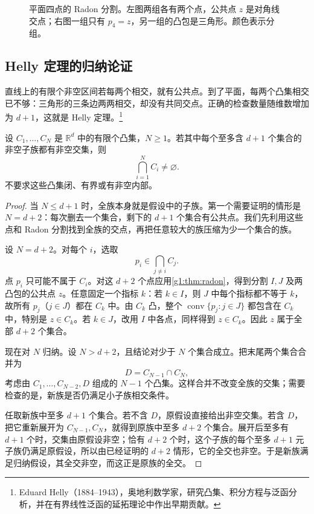 \begin{figure}[htbp]
	\centering
	
	\caption[平面四点的 Radon 分割]{平面四点的 Radon 分割。左图两组各有两个点，公共点 \(z\) 是对角线交点；右图一组只有 \(p_4=z\)，另一组的凸包是三角形。颜色表示分组。}
	\label{g1:fig:radon}
\end{figure}

\subsection{Helly 定理的归纳论证}
\label{g1:subsec:0302:03}

直线上的有限个非空区间若每两个相交，就有公共点。到了平面，每两个凸集相交已不够：三角形的三条边两两相交，却没有共同交点。正确的检查数量随维数增加为 \(d+1\)，这就是 Helly 定理。\footnote{Eduard Helly（1884--1943），奥地利数学家，研究凸集、积分方程与泛函分析，并在有界线性泛函的延拓理论中作出早期贡献。}

\begin{theorem}\label{g1:thm:helly}
	设 \(C_1,\ldots,C_N\) 是 \(\mathbb R^d\) 中的有限个凸集，\(N\ge1\)。若其中每个至多含 \(d+1\) 个集合的非空子族都有非空交集，则
	\[
		\bigcap_{i=1}^N C_i\ne\varnothing.
	\]
	不要求这些凸集闭、有界或有非空内部。
\end{theorem}
\begin{proof}
	当 \(N\le d+1\) 时，全族本身就是假设中的子族。第一个需要证明的情形是 \(N=d+2\)：每次删去一个集合，剩下的 \(d+1\) 个集合有公共点。我们先利用这些点和 Radon 分割找到全族的交点，再把任意较大的族压缩为少一个集合的族。

	设 \(N=d+2\)。对每个 \(i\)，选取
	\[
		p_i\in\bigcap_{j\ne i}C_j.
	\]
	点 \(p_i\) 只可能不属于 \(C_i\)。对这 \(d+2\) 个点应用\cref{g1:thm:radon}，得到分割 \(I,J\) 及两凸包的公共点 \(z\)。任意固定一个指标 \(k\)：若 \(k\in I\)，则 \(J\) 中每个指标都不等于 \(k\)，故所有 \(p_j\)（\(j\in J\)）都在 \(C_k\) 中。由 \(C_k\) 凸，整个 \(\operatorname{conv}\{p_j:j\in J\}\) 都包含在 \(C_k\) 中，特别是 \(z\in C_k\)。若 \(k\in J\)，改用 \(I\) 中各点，同样得到 \(z\in C_k\)。因此 \(z\) 属于全部 \(d+2\) 个集合。

	现在对 \(N\) 归纳。设 \(N>d+2\)，且结论对少于 \(N\) 个集合成立。把末尾两个集合合并为
	\[
		D=C_{N-1}\cap C_N,
	\]
	考虑由 \(C_1,\ldots,C_{N-2},D\) 组成的 \(N-1\) 个凸集。这样合并不改变全族的交集；需要检查的是，新族是否仍满足小子族相交条件。

	任取新族中至多 \(d+1\) 个集合。若不含 \(D\)，原假设直接给出非空交集。若含 \(D\)，把它重新展开为 \(C_{N-1},C_N\)，就得到原族中至多 \(d+2\) 个集合。展开后至多有 \(d+1\) 个时，交集由原假设非空；恰有 \(d+2\) 个时，这个子族的每个至多 \(d+1\) 元子族仍满足原假设，所以由已经证明的 \(d+2\) 情形，它的全交也非空。于是新族满足归纳假设，其全交非空，而这正是原族的全交。
\end{proof}

